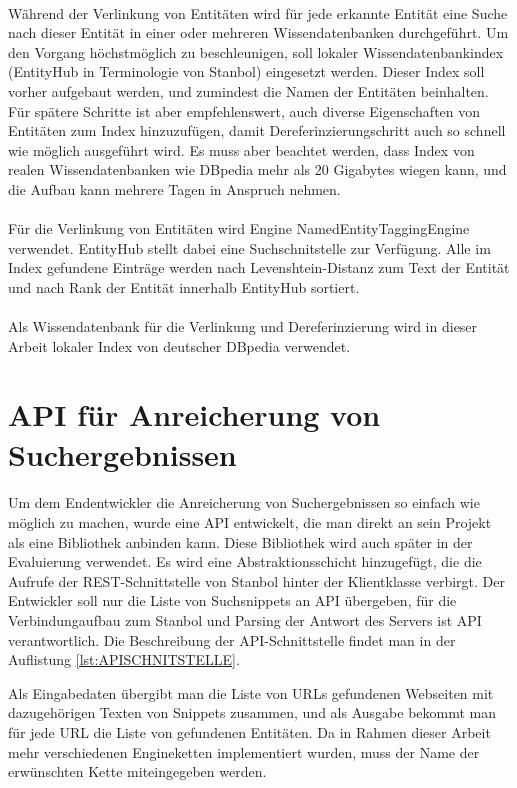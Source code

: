 \paragraph{}  
Während der Verlinkung von Entitäten wird für jede erkannte Entität eine Suche nach dieser Entität in einer oder mehreren Wissendatenbanken durchgeführt. Um den Vorgang höchstmöglich zu beschleunigen, soll lokaler Wissendatenbankindex (EntityHub in Terminologie von Stanbol) eingesetzt werden. Dieser Index soll vorher aufgebaut werden, und zumindest die Namen der Entitäten beinhalten. Für spätere Schritte ist aber empfehlenswert, auch diverse Eigenschaften von Entitäten zum Index hinzuzufügen, damit Dereferinzierungschritt auch so schnell wie möglich ausgeführt wird. Es muss aber beachtet werden, dass Index von realen Wissendatenbanken wie DBpedia mehr als 20 Gigabytes wiegen kann, und die Aufbau kann mehrere Tagen in Anspruch nehmen.

\paragraph{}
Für die Verlinkung von Entitäten wird Engine NamedEntityTaggingEngine verwendet. EntityHub stellt dabei eine Suchschnitstelle zur Verfügung. Alle im Index gefundene Einträge werden nach Levenshtein-Distanz zum Text der Entität und nach Rank der Entität innerhalb EntityHub sortiert.


\paragraph{}
Als Wissendatenbank für die Verlinkung und Dereferinzierung wird in dieser Arbeit lokaler Index von deutscher DBpedia verwendet.

\section{API für Anreicherung von Suchergebnissen}
\paragraph{}
Um dem Endentwickler die Anreicherung von Suchergebnissen so einfach wie möglich zu machen, wurde eine API entwickelt, die man direkt an sein Projekt als eine Bibliothek anbinden kann. Diese Bibliothek wird auch später in der Evaluierung verwendet. Es wird eine Abstraktionsschicht hinzugefügt, die die Aufrufe der REST-Schnittstelle von Stanbol hinter der Klientklasse verbirgt. Der Entwickler soll nur die Liste von Suchsnippets an API übergeben, für die Verbindungaufbau zum Stanbol und Parsing der Antwort des Servers ist API verantwortlich. Die Beschreibung der API-Schnittstelle findet man in der Auflistung \ref{lst:APISCHNITSTELLE}. 

\lstset{language=Java}


Als Eingabedaten übergibt man die Liste von URLs gefundenen Webseiten mit dazugehörigen Texten von Snippets zusammen, und als Ausgabe bekommt man für jede URL die Liste von gefundenen Entitäten. Da in Rahmen dieser Arbeit mehr verschiedenen Engineketten implementiert wurden, muss der Name der erwünschten Kette miteingegeben werden.